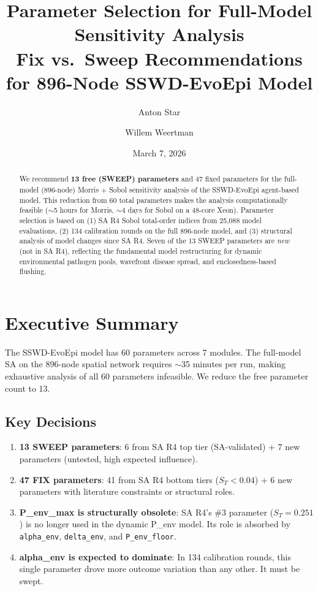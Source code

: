 \documentclass[11pt,a4paper]{article}
\title{\textbf{Parameter Selection for Full-Model Sensitivity Analysis}\\[6pt]
\large Fix vs.\ Sweep Recommendations for 896-Node SSWD-EvoEpi Model}
\author{Anton Star \and Willem Weertman}
\date{March 7, 2026}
\begin{document}
\maketitle
\thispagestyle{fancy}

\begin{abstract}
We recommend \textbf{13 free (SWEEP) parameters} and 47 fixed parameters for the full-model (896-node) Morris + Sobol sensitivity analysis of the SSWD-EvoEpi agent-based model. This reduction from 60 total parameters makes the analysis computationally feasible ($\sim$5 hours for Morris, $\sim$4 days for Sobol on a 48-core Xeon). Parameter selection is based on (1) SA R4 Sobol total-order indices from 25,088 model evaluations, (2) 134 calibration rounds on the full 896-node model, and (3) structural analysis of model changes since SA R4. Seven of the 13 SWEEP parameters are \emph{new} (not in SA R4), reflecting the fundamental model restructuring for dynamic environmental pathogen pools, wavefront disease spread, and enclosedness-based flushing.
\end{abstract}

\tableofcontents
\newpage

\section{Executive Summary}

The SSWD-EvoEpi model has 60 parameters across 7 modules. The full-model SA on the 896-node spatial network requires $\sim$35 minutes per run, making exhaustive analysis of all 60 parameters infeasible. We reduce the free parameter count to 13.

\subsection*{Key Decisions}

\begin{enumerate}
    \item \textbf{13 SWEEP parameters}: 6 from SA R4 top tier (SA-validated) + 7 new parameters (untested, high expected influence).
    \item \textbf{47 FIX parameters}: 41 from SA R4 bottom tiers ($S_T < 0.04$) + 6 new parameters with literature constraints or structural roles.
    \item \textbf{P\_env\_max is structurally obsolete}: SA R4's \#3 parameter ($S_T = 0.251$) is no longer used in the dynamic P\_env model. Its role is absorbed by \texttt{alpha\_env}, \texttt{delta\_env}, and \texttt{P\_env\_floor}.
    \item \textbf{alpha\_env is expected to dominate}: In 134 calibration rounds, this single parameter drove more outcome variation than any other. It must be swept.
\end{enumerate}
\end{document}
